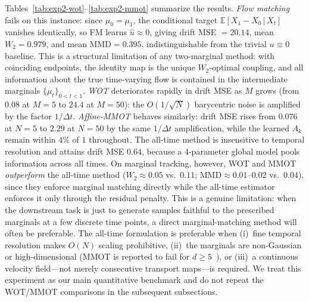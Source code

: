 \documentclass[11pt,leqno]{article}
\theoremstyle{plain}
\theoremstyle{remark}
\theoremstyle{definition}
\numberwithin{equation}{section}
\numberwithin{figure}{section}
\numberwithin{table}{section}
\begin{document}
Tables~\ref{tab:exp2-wot}--\ref{tab:exp2-mmot} summarize the results.
\emph{Flow matching} fails on this instance: since $\mu_0=\mu_1$, the
conditional target $\mathbb{E}[X_1-X_0\,|\,X_t]$ vanishes identically, so
FM learns $\hat u\approx 0$, giving drift MSE $=20.14$,
mean $W_2=0.979$, and mean $\mathrm{MMD}=0.395$, indistinguishable from
the trivial $u\equiv 0$ baseline.  This is a structural limitation of
any two-marginal method: with coinciding endpoints, the identity map is
the unique $W_2$-optimal coupling, and all information about the true
time-varying flow is contained in the intermediate marginals
$\{\mu_t\}_{0<t<1}$.
\emph{WOT} deteriorates rapidly in drift MSE as $M$ grows (from $0.08$
at $M{=}5$ to $24.4$ at $M{=}50$): the $O(1/\sqrt{N})$ barycentric noise
is amplified by the factor $1/\Delta t$.  \emph{Affine-MMOT} behaves
similarly: drift MSE rises from $0.076$ at $N{=}5$ to $2.29$ at $N{=}50$
by the same $1/\Delta t$ amplification, while the learned $A_k$ remain
within $4\%$ of $1$ throughout.  The all-time method is insensitive to
temporal resolution and attains drift MSE $0.64$, because a
$4$-parameter global model pools information across all times.
On marginal tracking, however, WOT and MMOT \emph{outperform} the
all-time method ($W_2\approx 0.05$ vs.\ $0.11$; $\mathrm{MMD}\approx
0.01$--$0.02$ vs.\ $0.04$), since they enforce marginal matching
directly while the all-time estimator enforces it only through the
residual penalty.  This is a genuine limitation: when the downstream
task is just to generate samples faithful to the prescribed marginals
at a few discrete time points, a direct marginal-matching method will
often be preferable.  The all-time formulation is preferable when
(i)~fine temporal resolution makes $O(N)$ scaling prohibitive,
(ii)~the marginals are non-Gaussian or high-dimensional (MMOT is
reported to fail for $d\ge 5$~\cite[Table~8]{sai-nak:2026}), or
(iii)~a continuous velocity field---not merely consecutive transport
maps---is required.  We treat this experiment as our main quantitative
benchmark and do not repeat the WOT/MMOT comparisons in the subsequent
subsections.
\end{document}
